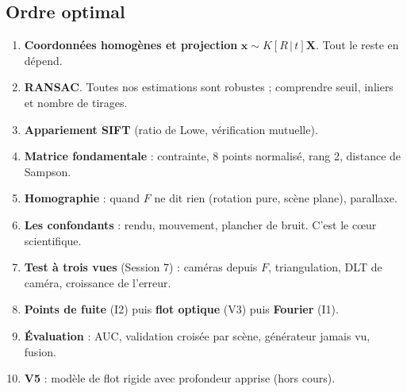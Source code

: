 \documentclass[11pt,a4paper]{article}
\newcommand{\x}{\mathbf{x}}
\newcommand{\X}{\mathbf{X}}
\begin{document}
\subsection{Ordre optimal}
\begin{enumerate}
  \item \textbf{Coordonnées homogènes et projection} $\x \sim K[R\,|\,t]\X$. Tout le reste en dépend.
  \item \textbf{RANSAC}. Toutes nos estimations sont robustes ; comprendre seuil, inliers et nombre
        de tirages.
  \item \textbf{Appariement SIFT} (ratio de Lowe, vérification mutuelle).
  \item \textbf{Matrice fondamentale} : contrainte, 8 points normalisé, rang 2, distance de Sampson.
  \item \textbf{Homographie} : quand $F$ ne dit rien (rotation pure, scène plane), parallaxe.
  \item \textbf{Les confondants} : rendu, mouvement, plancher de bruit. C'est le cœur scientifique.
  \item \textbf{Test à trois vues} (Session 7) : caméras depuis $F$, triangulation, DLT de caméra,
        croissance de l'erreur.
  \item \textbf{Points de fuite} (I2) puis \textbf{flot optique} (V3) puis \textbf{Fourier} (I1).
  \item \textbf{Évaluation} : AUC, validation croisée par scène, générateur jamais vu, fusion.
  \item \textbf{V5} : modèle de flot rigide avec profondeur apprise (hors cours).
\end{enumerate}
\end{document}
